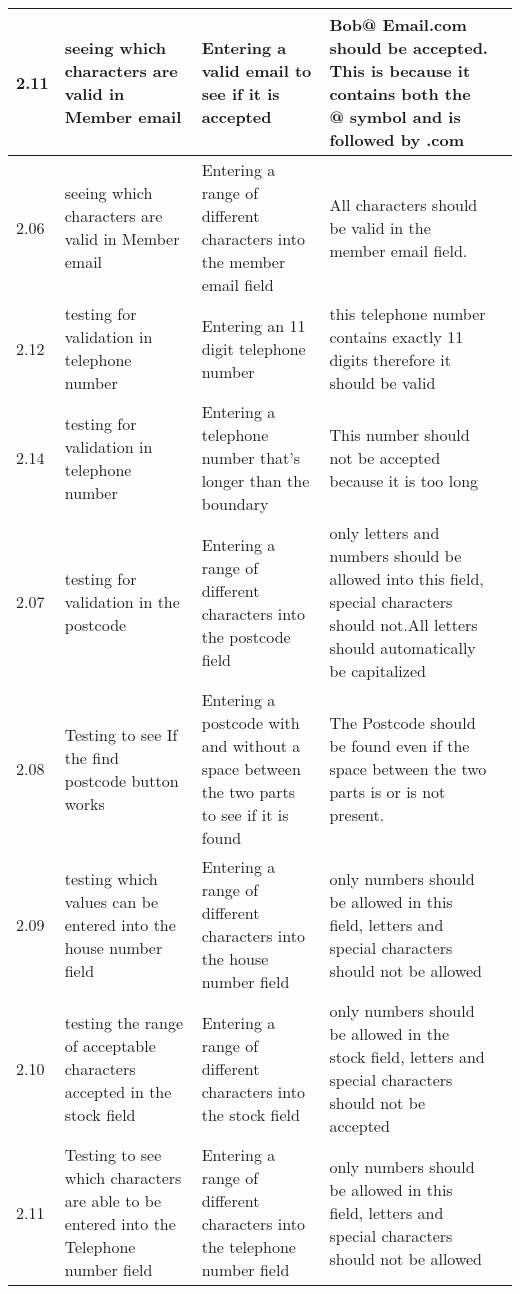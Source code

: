 \begin{flushleft}
\begin{longtable}{|p{1cm}|p{2.5cm}|p{2.5cm}|p{2cm}|p{2cm}|}
	\rowcolor{dark-grey}2.11 & seeing which characters are valid in Member email & Entering a valid email to see if it is accepted  &  Bob@ Email.com should be accepted. This is because it contains both the @ symbol and is followed by .com & \\ \hline
	\rowcolor{light-grey}2.06 & seeing which characters are valid in Member email & Entering a range of different characters into the member email field &  All characters should be valid in the member email field.& \\ \hline
	\rowcolor{dark-grey}2.12 & testing for validation in telephone number & Entering an 11 digit telephone number  & this telephone number contains exactly 11 digits therefore it should be valid & \\ \hline
	\rowcolor{dark-grey}2.14 & testing for validation in telephone number & Entering a telephone number that's longer than the boundary & This number should not be accepted because it is too long & \\ \hline
	\rowcolor{light-grey}2.07 & testing for validation in the postcode & Entering a range of different characters into the postcode field & only letters and numbers should be allowed into this field, special characters should not.All letters should automatically be capitalized& \\ \hline
	\rowcolor{light-grey}2.08 & Testing to see If the find postcode button works & Entering a postcode with and without a space between the two parts to see if it is found &The Postcode should be found even if the space between the two parts is or is not present.& \\ \hline
	\rowcolor{light-grey}2.09 & testing which values can be entered into the house number field & Entering a range of different characters into the house number field & only numbers should be allowed in this field, letters and special characters should not be allowed & \\ \hline
	\rowcolor{light-grey}2.10 & testing the range of acceptable characters accepted in the stock field  & Entering a range of different characters into the stock field & only numbers should be allowed in the stock field, letters and special characters should not be accepted & \\ \hline
	\rowcolor{light-grey}2.11 & Testing to see which characters are able to be entered into the Telephone number field & Entering a range of different characters into the telephone number field & only numbers should be allowed in this field, letters and special characters should not be allowed & \\ \hline

\end{longtable}
\end{flushleft}
